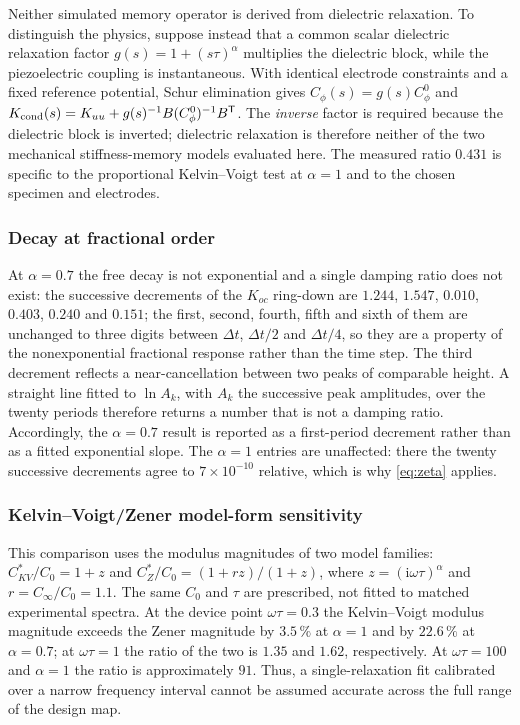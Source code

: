 Neither simulated memory operator is derived from dielectric relaxation.
To distinguish the physics, suppose instead that a common scalar dielectric
relaxation factor $g(s)=1+(s\tau)^\alpha$ multiplies the dielectric block,
while the piezoelectric coupling is instantaneous. With identical electrode
constraints and a fixed reference potential, Schur elimination gives
$C_\phi(s)=g(s)C_\phi^0$ and
$K_{\rm cond}(s)=K_{uu}+g(s)^{-1}B(C_\phi^0)^{-1}B^{\mathsf T}$.
The \emph{inverse} factor is required because the dielectric block is
inverted; dielectric relaxation is therefore neither of the two mechanical
stiffness-memory models evaluated here. The measured ratio $0.431$ is
specific to the proportional Kelvin--Voigt test at $\alpha=1$ and to the
chosen specimen and electrodes.



\subsubsection{Decay at fractional order}

At $\alpha=0.7$ the free decay is not exponential and a single damping ratio
does not exist: the successive decrements of the $K_{oc}$ ring-down are
$1.244$, $1.547$, $0.010$, $0.403$, $0.240$ and $0.151$; the first, second,
fourth, fifth and sixth of them are unchanged to three digits between
$\Delta t$, $\Delta t/2$ and $\Delta t/4$, so they are a property of the
nonexponential fractional response rather than the time step. The third
decrement reflects a near-cancellation
between two peaks of comparable height. A straight line fitted to $\ln A_k$, with $A_k$ the successive peak amplitudes,
over the twenty periods therefore returns a number that is not a damping ratio.
Accordingly, the $\alpha=0.7$ result is reported as a first-period
decrement rather than as a fitted exponential slope. The $\alpha=1$ entries are
unaffected: there the twenty successive decrements agree to $7\times10^{-10}$
relative, which is why \eqref{eq:zeta} applies.

\subsubsection{Kelvin--Voigt/Zener model-form sensitivity}

This comparison uses the modulus magnitudes of two model families:
$C^*_{KV}/C_0=1+z$ and $C^*_{Z}/C_0=(1+r z)/(1+z)$,
where $z=(\mathrm{i}\omega\tau)^\alpha$ and $r=C_\infty/C_0=1.1$.
The same $C_0$ and $\tau$ are prescribed, not fitted to matched experimental spectra. At the device point $\omega\tau=0.3$ the
Kelvin--Voigt modulus magnitude exceeds the Zener magnitude by $3.5\,\%$ at $\alpha=1$ and by
$22.6\,\%$ at $\alpha=0.7$; at $\omega\tau=1$ the ratio of the two is $1.35$
and $1.62$, respectively. At $\omega\tau=100$ and $\alpha=1$ the ratio is approximately $91$. Thus, a single-relaxation fit calibrated over a narrow frequency interval
cannot be assumed accurate across the full range of the design map.

